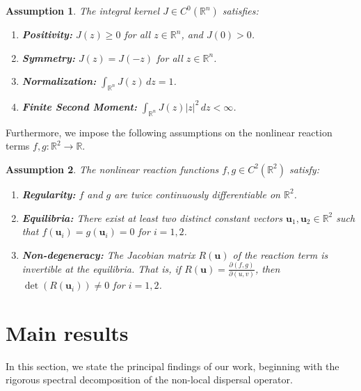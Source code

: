 \documentclass[11pt, a4paper]{article}
\theoremstyle{break}
\theoremstyle{break}
\theoremstyle{break}
\newtheorem{asm}{Assumption}[section]
\theoremstyle{break}
\theoremstyle{break}
\theoremstyle{break}
\theoremstyle{break}
\theoremstyle{break}
\theoremstyle{break}
\theoremstyle{break}
\begin{document}
\begin{asm} \label{asm:KernelProperties}
    The integral kernel $J \in C^0(\mathbb{R}^n)$ satisfies:
    \begin{enumerate}[label=(\textit{J\arabic*})]
        \item \textbf{Positivity:} $J(z) \geq 0$ for all $z \in \mathbb{R}^n$, and $J(0) > 0$.
        \item \textbf{Symmetry:} $J(z) = J(-z)$ for all $z \in \mathbb{R}^n$.
        \item \textbf{Normalization:} $\int_{\mathbb{R}^n} J(z) \, dz = 1$.
        \item \textbf{Finite Second Moment:} $\int_{\mathbb{R}^n} J(z)|z|^2 \, dz < \infty$.
    \end{enumerate}
\end{asm}

Furthermore, we impose the following assumptions on the nonlinear reaction terms $f, g: \mathbb{R}^2 \to \mathbb{R}$.

\begin{asm} \label{asm:ReactionKinetics}
    The nonlinear reaction functions $f, g \in C^2(\mathbb{R}^2)$ satisfy:
    \begin{enumerate}[label=(\textit{F\arabic*})]
        \item \textbf{Regularity:} $f$ and $g$ are twice continuously differentiable on $\mathbb{R}^2$.
        \item \textbf{Equilibria:} There exist at least two distinct constant vectors $\mathbf{u}_1, \mathbf{u}_2 \in \mathbb{R}^2$ such that $f(\mathbf{u}_i) = g(\mathbf{u}_i) = 0$ for $i=1,2$.
        \item \textbf{Non-degeneracy:} The Jacobian matrix $R(\mathbf{u})$ of the reaction term is invertible at the equilibria. That is, if $R(\mathbf{u}) = \frac{\partial(f,g)}{\partial(u,v)}$, then $\det(R(\mathbf{u}_i)) \neq 0$ for $i=1,2$.
    \end{enumerate}
\end{asm}

\section{Main results}

In this section, we state the principal findings of our work, beginning with the rigorous spectral decomposition of the non-local dispersal operator.
\end{document}
